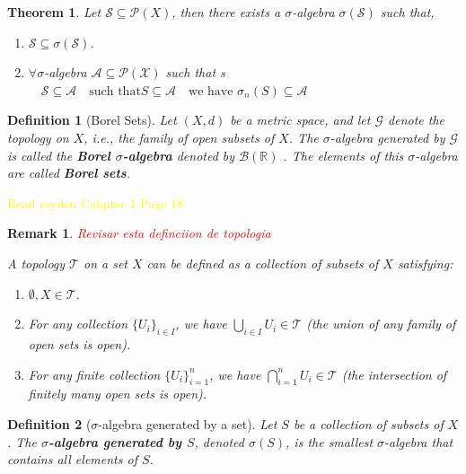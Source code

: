 \documentclass[10pt, oneside]{article}
\newenvironment{definitionbox}[1][]{\begin{defbox}\begin{defn}[#1]}{\end{defn}\end{defbox}}
\numberwithin{equation}{section}
\newtheorem{thm}{Theorem}[section]
\newtheorem{defn}{Definition}[section]
\newtheorem{rem}{Remark}
\begin{document}
\begin{thm}
    Let \(\mathcal{S} \subseteq \mathcal{P}(X)\), then there exists a \(\sigma\)-algebra \(\sigma (\mathcal{S})\) such that,
\begin{center}
\begin{minipage}{0.8\textwidth}
\begin{enumerate}[label=(\roman*)]
    \item \(\mathcal{S} \subseteq \sigma(\mathcal{S})\).  
    \item \(\forall \sigma\)-algebra \(\mathcal{A} \subseteq \mathcal{P(\text{X})}\) such that s \(\quad \mathcal{S} \subseteq \mathcal{A} \quad \text{such that} S \subseteq
    \mathcal{A} \quad \text{we have } \sigma_n (S) \subseteq \mathcal{A}\) 
\end{enumerate}
\end{minipage}
\end{center}
\end{thm}

\begin{definitionbox}[Borel Sets]
Let $(X, d)$ be a metric space, and let $\mathcal{G}$ denote the topology on $X$, i.e., the family of open subsets of $X$.
The $\sigma$-algebra generated by $\mathcal{G}$ is called the \textbf{Borel $\sigma$-algebra} denoted by $\mathcal{B(\mathbb{R})}$ .
The elements of this $\sigma$-algebra are called \textbf{Borel sets}.
\end{definitionbox}

\textcolor{yellow}{Read royden Cahpter 1 Page 18}

\begin{rem}
\textcolor{red}{Revisar esta definciion de topologia}

A topology $\mathcal{T}$ on a set $X$ can be defined as a collection of subsets of $X$ satisfying:
\begin{enumerate}
    \item $\emptyset, X \in \mathcal{T}$.
    \item For any collection $\{U_i\}_{i \in I}$, we have $\bigcup_{i \in I} U_i \in \mathcal{T}$ \quad (the union of any family of open sets is open).
    \item For any finite collection $\{U_i\}_{i=1}^{n}$, we have $\bigcap_{i=1}^{n} U_i \in \mathcal{T}$ \quad (the intersection of finitely many open sets is open).
\end{enumerate}
\end{rem}

\begin{defn}[$\sigma$-algebra generated by a set]
Let $S$ be a collection of subsets of $X$. The \textbf{$\sigma$-algebra generated by $S$}, denoted $\sigma(S)$, is the smallest $\sigma$-algebra that contains all elements of $S$.
\end{defn}
\end{document}
